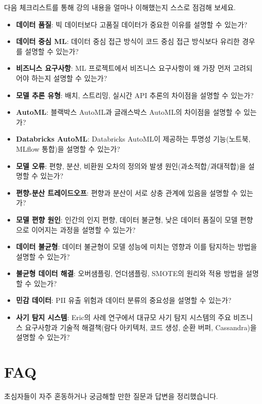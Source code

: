 \documentclass[11pt,a4paper]{article}
\begin{document}
\begin{itemize}
\begin{itemize}
\begin{itemize}
\begin{itemize}
\begin{itemize}
\begin{enumerate}
다음 체크리스트를 통해 강의 내용을 얼마나 이해했는지 스스로 점검해 보세요.

\begin{itemize}
    \item \textbf{데이터 품질}: 빅 데이터보다 고품질 데이터가 중요한 이유를 설명할 수 있는가?
    \item \textbf{데이터 중심 ML}: 데이터 중심 접근 방식이 코드 중심 접근 방식보다 유리한 경우를 설명할 수 있는가?
    \item \textbf{비즈니스 요구사항}: ML 프로젝트에서 비즈니스 요구사항이 왜 가장 먼저 고려되어야 하는지 설명할 수 있는가?
    \item \textbf{모델 추론 유형}: 배치, 스트리밍, 실시간 API 추론의 차이점을 설명할 수 있는가?
    \item \textbf{AutoML}: 블랙박스 AutoML과 글래스박스 AutoML의 차이점을 설명할 수 있는가?
    \item \textbf{Databricks AutoML}: Databricks AutoML이 제공하는 투명성 기능(노트북, MLflow 통합)을 설명할 수 있는가?
    \item \textbf{모델 오류}: 편향, 분산, 비환원 오차의 정의와 발생 원인(과소적합/과대적합)을 설명할 수 있는가?
    \item \textbf{편향-분산 트레이드오프}: 편향과 분산이 서로 상충 관계에 있음을 설명할 수 있는가?
    \item \textbf{모델 편향 원인}: 인간의 인지 편향, 데이터 불균형, 낮은 데이터 품질이 모델 편향으로 이어지는 과정을 설명할 수 있는가?
    \item \textbf{데이터 불균형}: 데이터 불균형이 모델 성능에 미치는 영향과 이를 탐지하는 방법을 설명할 수 있는가?
    \item \textbf{불균형 데이터 해결}: 오버샘플링, 언더샘플링, SMOTE의 원리와 적용 방법을 설명할 수 있는가?
    \item \textbf{민감 데이터}: PII 유출 위험과 데이터 분류의 중요성을 설명할 수 있는가?
    \item \textbf{사기 탐지 시스템}: Eric의 사례 연구에서 대규모 사기 탐지 시스템의 주요 비즈니스 요구사항과 기술적 해결책(람다 아키텍처, 코드 생성, 순환 버퍼, Cassandra)을 설명할 수 있는가?
\end{itemize}

\newpage
\section*{FAQ}

초심자들이 자주 혼동하거나 궁금해할 만한 질문과 답변을 정리했습니다.


\end{enumerate}
\end{itemize}
\end{itemize}
\end{itemize}
\end{itemize}
\end{itemize}
\end{document}
